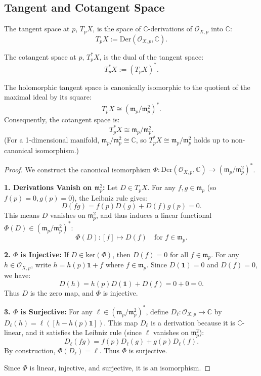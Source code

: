 \documentclass{article}
\begin{document}
\subsection{Tangent and Cotangent Space}

\begin{definition}
The tangent space at $p$, $T_p X$, is the space of $\mathbb{C}$-derivations of $\mathcal{O}_{X,p}$ into $\mathbb{C}$:
$$ T_p X := \mathrm{Der}(\mathcal{O}_{X,p}, \mathbb{C}). $$
\end{definition}

\begin{definition}
The cotangent space at $p$, $T_p^* X$, is the dual of the tangent space:
$$ T_p^* X := (T_p X)^*. $$
\end{definition}

\begin{lemma}
The holomorphic tangent space is canonically isomorphic to the quotient of the maximal ideal by its square:
$$ T_p X \cong (\mathfrak{m}_p / \mathfrak{m}_p^2)^*. $$
Consequently, the cotangent space is:
$$ T_p^* X \cong \mathfrak{m}_p / \mathfrak{m}_p^2. $$
(For a 1-dimensional manifold, $\mathfrak{m}_p / \mathfrak{m}_p^2 \cong \mathbb{C}$, so $T_p^* X \cong \mathfrak{m}_p / \mathfrak{m}_p^2$ holds up to non-canonical isomorphism.)
\end{lemma}

\begin{proof}
We construct the canonical isomorphism $\Phi: \mathrm{Der}(\mathcal{O}_{X,p}, \mathbb{C}) \to (\mathfrak{m}_p / \mathfrak{m}_p^2)^*$.

\textbf{1. Derivations Vanish on $\mathfrak{m}_p^2$:}
Let $D \in T_p X$. For any $f, g \in \mathfrak{m}_p$ (so $f(p)=0, g(p)=0$), the Leibniz rule gives:
$$ D(fg) = f(p)D(g) + D(f)g(p) = 0. $$
This means $D$ vanishes on $\mathfrak{m}_p^2$, and thus induces a linear functional $\Phi(D) \in (\mathfrak{m}_p / \mathfrak{m}_p^2)^*$:
$$ \Phi(D): [f] \mapsto D(f) \quad \text{for } f \in \mathfrak{m}_p. $$

\textbf{2. $\Phi$ is Injective:}
If $D \in \mathrm{ker}(\Phi)$, then $D(f)=0$ for all $f \in \mathfrak{m}_p$. For any $h \in \mathcal{O}_{X,p}$, write $h = h(p)\mathbf{1} + f$ where $f \in \mathfrak{m}_p$. Since $D(\mathbf{1})=0$ and $D(f)=0$, we have:
$$ D(h) = h(p)D(\mathbf{1}) + D(f) = 0 + 0 = 0. $$
Thus $D$ is the zero map, and $\Phi$ is injective.

\textbf{3. $\Phi$ is Surjective:}
For any $\ell \in (\mathfrak{m}_p / \mathfrak{m}_p^2)^*$, define $D_\ell: \mathcal{O}_{X,p} \to \mathbb{C}$ by $D_\ell(h) = \ell([h - h(p)\mathbf{1}])$. This map $D_\ell$ is a derivation because it is $\mathbb{C}$-linear, and it satisfies the Leibniz rule (since $\ell$ vanishes on $\mathfrak{m}_p^2$):
$$ D_\ell(fg) = f(p)D_\ell(g) + g(p)D_\ell(f). $$
By construction, $\Phi(D_\ell) = \ell$. Thus $\Phi$ is surjective.

Since $\Phi$ is linear, injective, and surjective, it is an isomorphism.
\end{proof}
\end{document}
